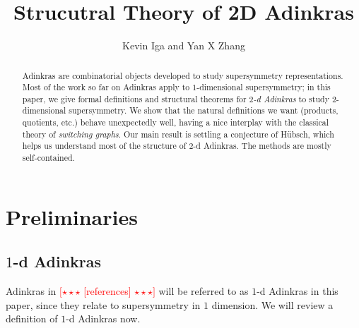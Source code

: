 \documentclass[12pt,twoside,singlespace]{article}
\title{Strucutral Theory of 2D Adinkras}
\author{Kevin Iga and Yan X Zhang}
\numberwithin{equation}{section}
\theoremstyle{definition}
\newcommand{\com}[1]{\textcolor{red}{$[\star \star \star$ #1 $\star \star \star]$}}
\begin{document}
\pagestyle{plain}

\maketitle

\begin{abstract}
Adinkras are combinatorial objects developed to study supersymmetry representations. Most of the work so far on Adinkras apply to $1$-dimensional supersymmetry; in this paper, we give formal definitions and structural theorems for \emph{$2$-d Adinkras} to study $2$-dimensional supersymmetry. We show that the natural definitions we want (products, quotients, etc.) behave unexpectedly well, having a nice interplay with the classical theory of \emph{switching graphs}. Our main result is settling a conjecture of H\"ubsch, which helps us understand most of the structure of $2$-d Adinkras. The methods are mostly self-contained.
\end{abstract}

\section{Preliminaries}

\subsection{$1$-d Adinkras}
Adinkras in \com{[references]} will be referred to as $1$-d Adinkras in this paper, since they relate to supersymmetry in $1$ dimension.  We will review a definition of $1$-d Adinkras now.
\end{document}
